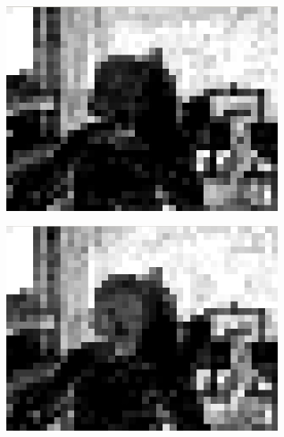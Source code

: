 \documentclass[11pt]{article} %
\begin{document}
\begin{figure}
\begin{subfigure}[t]{0.45\textwidth}
		\includegraphics[width=\textwidth]{PaulDefault120_91250kbps_psnr}
		\caption{}
		\label{fig:QP Offset PSNR comparison 1}
	\end{subfigure}
	\begin{subfigure}[t]{0.45\textwidth}
		\centering
		\includegraphics[width=\textwidth]{QPOffset/paul120_250kbps_QPoffset4_psnr}
		\caption{}
		\label{fig:QP Offset PSNR comparison 2}
	\end{subfigure}
	\begin{subfigure}[t]{0.45\textwidth}
		\centering

\end{subfigure}
\end{figure}
\end{document}
